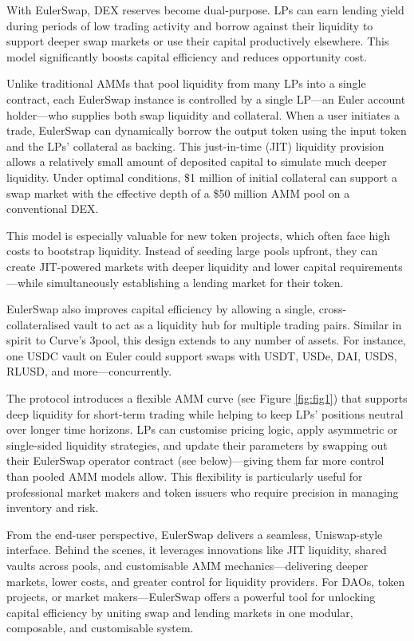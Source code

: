 \documentclass{article}
\begin{document}
With EulerSwap, DEX reserves become dual-purpose. LPs can earn lending yield during periods of low trading activity and borrow against their liquidity to support deeper swap markets or use their capital productively elsewhere. This model significantly boosts capital efficiency and reduces opportunity cost.

Unlike traditional AMMs that pool liquidity from many LPs into a single contract, each EulerSwap instance is controlled by a single LP—an Euler account holder—who supplies both swap liquidity and collateral. When a user initiates a trade, EulerSwap can dynamically borrow the output token using the input token and the LPs' collateral as backing. This just-in-time (JIT) liquidity provision allows a relatively small amount of deposited capital to simulate much deeper liquidity. Under optimal conditions, \$1 million of initial collateral can support a swap market with the effective depth of a \$50 million AMM pool on a conventional DEX.

This model is especially valuable for new token projects, which often face high costs to bootstrap liquidity. Instead of seeding large pools upfront, they can create JIT-powered markets with deeper liquidity and lower capital requirements—while simultaneously establishing a lending market for their token.

EulerSwap also improves capital efficiency by allowing a single, cross-collateralised vault to act as a liquidity hub for multiple trading pairs. Similar in spirit to Curve’s 3pool, this design extends to any number of assets. For instance, one USDC vault on Euler could support swaps with USDT, USDe, DAI, USDS, RLUSD, and more—concurrently.

The protocol introduces a flexible AMM curve (see Figure \ref{fig:fig1}) that supports deep liquidity for short-term trading while helping to keep LPs' positions neutral over longer time horizons. LPs can customise pricing logic, apply asymmetric or single-sided liquidity strategies, and update their parameters by swapping out their EulerSwap operator contract (see below)—giving them far more control than pooled AMM models allow. This flexibility is particularly useful for professional market makers and token issuers who require precision in managing inventory and risk.

From the end-user perspective, EulerSwap delivers a seamless, Uniswap-style interface. Behind the scenes, it leverages innovations like JIT liquidity, shared vaults across pools, and customisable AMM mechanics—delivering deeper markets, lower costs, and greater control for liquidity providers. For DAOs, token projects, or market makers—EulerSwap offers a powerful tool for unlocking capital efficiency by uniting swap and lending markets in one modular, composable, and customisable system.
\end{document}
